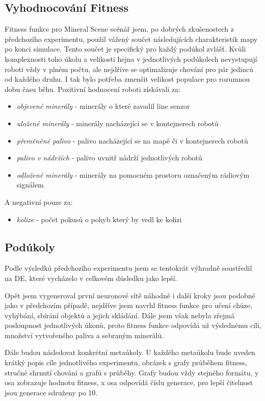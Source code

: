 \subsection{Vyhodnocování Fitness}
Fitness funkce pro Mineral Scene scénář jsem, po dobrých zkušenostech z předchozího experimentu, použil vážený součet následujících charakteristik mapy po konci simulace. Tento součet je specifický pro každý podúkol zvlášť. Kvůli komplexnosti toho úkolu a velikosti hejna v jednotlivých podúkolech nevystupují roboti vždy v plném počtu, ale nejdříve se optimalizuje chování pro pár jedinců od každého druhu. I tak bylo potřeba zmenšit velikost populace pro rozumnou dobu času běhu. Pozitivní hodnocení roboti získávali za: 
\begin{itemize}
	\item \textit{objevené minerály} - minerály o které zavadil line senzor
	\item \textit{uložené minerály} - minerály nacházející se v kontejnerech robotů 
	\item \textit{přeměněné palivo} - palivo nacházející se na mapě či v kontejnerech robotů
	\item \textit{palivo v nádržích} - palivo uvnitř nádrží jednotlivých robotů
	\item \textit{odložené minerály} - minerály na pomocném prostoru označeným rádiovým signálem
\end{itemize}
A negativní pouze za: 
\begin{itemize}
	\item \textit{kolize} - počet pokusů o pohyb který by vedl ke kolizi
\end{itemize}
\subsection{Podúkoly}
Podle výsledků předchozího experimentu jsem se tentokrát výhradně soustředil na DE, které vycházelo v celkovém důsledku jako lepší.  
\par 
Opět jsem vygeneroval první neuronové sítě náhodně i další kroky jsou podobné jako v předchozím případě, nejdříve jsem navrhl fitness funkce pro učení chůze, vyhýbání, sbírání objektů a jejich skládání. Dále jsem však nebyla zřejmá posloupnost jednotlivých úkonů, proto fitness funkce odpovídá už výslednému cíli, množství vytvořeného paliva a sebraným minerálů.
\par 
Dále budou následovat konkrétní metaúkoly. U každého metaúkolu bude uveden krátký popis cíle jednotlivého experimentu, obrázek s grafy průběhem fitness, stručné shrnutí chování a grafů s průběhy. Grafy budou vždy stejného formátu,  y osa zobrazuje hodnotu fitness, x osa odpovídá číslu generace, pro lepší čitelnost jsou generace sdruženy po 10. 
\clearpage

